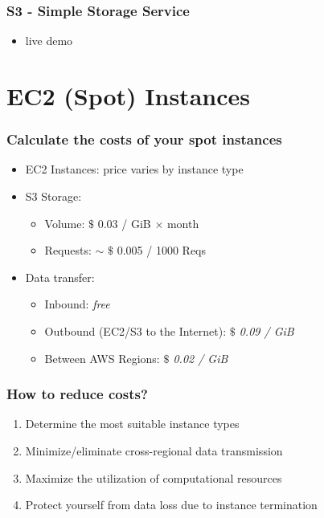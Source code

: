 \documentclass[10pt]{beamer}
\begin{document}
\begin{frame}
    \frametitle{S3 - Simple Storage Service}
    \begin{itemize}
        \item live demo
    \end{itemize}
\end{frame}

\section{EC2 (Spot) Instances}
\begin{frame}
    \frametitle{Calculate the costs of your spot instances}
    \begin{itemize}
        \item EC2 Instances: price varies by instance type
        \item S3 Storage: 
            \begin{itemize}
                \item Volume: {\color{blue} $\$$ 0.03 / GiB $\times$ month}
                \item Requests: {\color{blue} $\sim$ $\$$ 0.005 / 1000 Reqs}
            \end{itemize}
        \item Data transfer: 
            \begin{itemize}
                \item Inbound: {\it free}
                \item Outbound (EC2/S3 to the Internet): {\color{blue} \it $\$$ 0.09 / GiB}
                \item Between AWS Regions: {\color{blue} \it $\$$ 0.02 / GiB}
            \end{itemize}
    \end{itemize}
\end{frame}

\begin{frame}
    \frametitle{How to reduce costs?}
    \begin{enumerate}
        \item Determine the most suitable instance types
        \item Minimize/eliminate cross-regional data transmission
        \item Maximize the utilization of computational resources
        \item Protect yourself from data loss due to instance termination
    \end{enumerate}
\end{frame}
\end{document}
